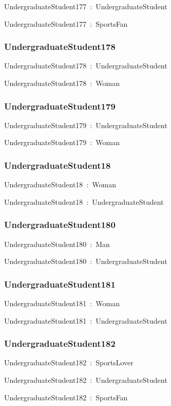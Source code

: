 \documentclass{article}
\begin{document}
UndergraduateStudent177~:~UndergraduateStudent

UndergraduateStudent177~:~SportsFan

\subsubsection*{UndergraduateStudent178}

UndergraduateStudent178~:~UndergraduateStudent

UndergraduateStudent178~:~Woman

\subsubsection*{UndergraduateStudent179}

UndergraduateStudent179~:~UndergraduateStudent

UndergraduateStudent179~:~Woman

\subsubsection*{UndergraduateStudent18}

UndergraduateStudent18~:~Woman

UndergraduateStudent18~:~UndergraduateStudent

\subsubsection*{UndergraduateStudent180}

UndergraduateStudent180~:~Man

UndergraduateStudent180~:~UndergraduateStudent

\subsubsection*{UndergraduateStudent181}

UndergraduateStudent181~:~Woman

UndergraduateStudent181~:~UndergraduateStudent

\subsubsection*{UndergraduateStudent182}

UndergraduateStudent182~:~SportsLover

UndergraduateStudent182~:~UndergraduateStudent

UndergraduateStudent182~:~SportsFan
\end{document}
